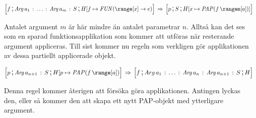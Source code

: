\documentclass[../Core]{subfiles}
\begin{document}
\begin{align*}
\conf{}{f \csep \mobj{Arg}\, a_{1} \casep \ldots \casep \mobj{Arg}\, a_{m} \casep S \csep H[f\mapsto\FUN{\range[x]}e} 
 \rulesep  \conf{}{p\csep S\csep H[x\mapsto\PAP f{\rangem[a]}]}
\end{align*}


Antalet argument $m$ är här mindre än antalet parametrar $n$.
Alltså kan det ses som en sparad funktionsapplikation som kommer att
utföras när resterande argument appliceras. Till sist kommer nu
regeln som verkligen gör applikationen av dessa partiellt applicerade
objekt.

\begin{align*}
\conf{}{p \csep \mobj{Arg}\, a_{n+1} \casep S \csep H[p\mapsto\PAP f{\range[a]}}
\rulesep \conf{}{f \csep Arg\, a_{1} \casep \ldots \casep \mobj{Arg}\, a_{n} \casep \mobj{Arg}\, a_{n+1} \casep S \csep H}
\end{align*}


Denna regel kommer återigen att försöka göra applikationen. Antingen lyckas
den, eller så kommer den att skapa ett nytt PAP-objekt med ytterligare
argument.
\end{document}
